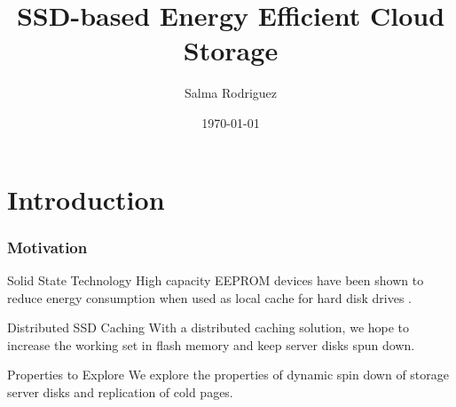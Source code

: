 \documentclass{beamer}
\title{SSD-based Energy Efficient Cloud Storage}
\author{Salma Rodriguez}
\institute [FIU]{
    Florida International University \\
    {\emph{srodr063@fiu.edu}}
}
\date{\today}
\begin{document}
\begin{frame}
    \titlepage
\end{frame}
%
\section{Introduction}
%
\begin{frame}
    \frametitle{Motivation}
    \begin{block}
	{Solid State Technology}
	High capacity EEPROM devices have been shown to
	reduce energy consumption when used
	as local cache for hard disk drives \cite{key2,key3}.
    \end{block}
    \vspace{7pt}
    \begin{block}
	{Distributed SSD Caching}
	With a distributed caching solution, we hope to increase
	the working set in flash memory and keep server disks spun down.
    \end{block}
    \vspace{7pt}
    \begin{block}
	{Properties to Explore}
	We explore the properties of dynamic spin down of storage
	server disks and replication of cold pages.
    \end{block}
\end{frame}
\end{document}
